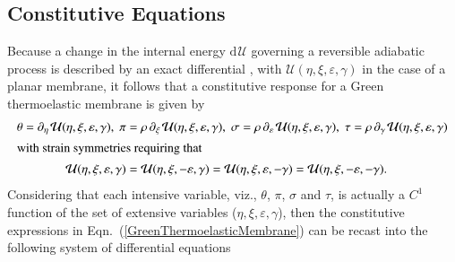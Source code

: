 \subsection{Constitutive Equations}

Because a change in the internal energy $\mathrm{d} \hspace{1pt} \mathcal{U}$ governing a reversible adiabatic process is described by an exact differential \cite{Caratheodory09}, with $\mathcal{U}(\eta, \xi, \varepsilon, \gamma)$ in the case of a planar membrane, it follows that a constitutive response for a Green thermo\-elastic membrane is given by
\begin{subequations}
    \label{GreenThermoelasticity}
    \begin{align}
    \theta = \partial_{\eta\,} \mathcal{U}(\eta, \xi, \varepsilon, \gamma) , \;
    \pi & = \rho \, \partial_{\xi\,} \mathcal{U}(\eta, \xi, \varepsilon, \gamma) , \;
    \sigma = \rho \, \partial_{\varepsilon\,} \mathcal{U}(\eta, \xi, \varepsilon, \gamma) , \;
    \tau = \rho \, \partial_{\gamma\,} \mathcal{U}(\eta, \xi, \varepsilon, \gamma)
    \label{GreenThermoelasticMembrane} \\
    \intertext{with strain symmetries requiring that}
    \mathcal{U}(\eta, \xi, \varepsilon, \gamma) & =
    \mathcal{U}(\eta, \xi, -\varepsilon, \gamma) = 
    \mathcal{U}(\eta, \xi, \varepsilon, -\gamma) = 
    \mathcal{U}(\eta, \xi, -\varepsilon, -\gamma) .
    \label{internalEnergyInveriance}
    \end{align}
\end{subequations}
Considering that each intensive variable, viz., $\theta$, $\pi$, $\sigma$ and $\tau$, is actually a $C^1$ function of the set of extensive variables ($\eta , \xi , \varepsilon , \gamma$), then the constitutive expressions in Eqn.~(\ref{GreenThermoelasticMembrane}) can be recast into the following system of differential equations
